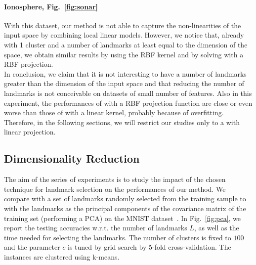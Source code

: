 \paragraph{Ionosphere, Fig.~\ref{fig:sonar}} With this dataset, our method is not able to capture the non-linearities of the input space by combining local linear models. However, we notice that, already with 1 cluster and a number of landmarks at least equal to the dimension of the space, we obtain similar results by using the RBF kernel and by solving \landSVM with a RBF projection.
\\
 
In conclusion, we  claim that it is not interesting to have a number of landmarks greater than the dimension of the input space and that reducing the number of landmarks is not conceivable on datasets of small number of features. 
Also in this experiment, the performances of \landSVM with a RBF projection function are close or even worse than those of \landSVM with a linear kernel, probably because of overfitting. Therefore, in the following sections, we will restrict our studies only to a \landSVM with linear projection.

\subsection{Dimensionality Reduction}
The aim of the series of experiments is to study the impact of the chosen technique for landmark selection on the performances of our method. We compare  \landSVM with a set of landmarks randomly selected from the training sample to \landSVM with the landmarks as the principal components of the covariance matrix of the training set (performing a PCA) on the MNIST dataset~\cite{lecun-mnisthandwrittendigit-2010}. In Fig.~\ref{fig:pca}, we report the testing accuracies w.r.t. the number of landmarks $L$, as well as the time needed for selecting the landmarks. The number of clusters is fixed to $100$ and the parameter $c$ is tuned by grid search by 5-fold cross-validation. The instances are clustered using k-means. 


